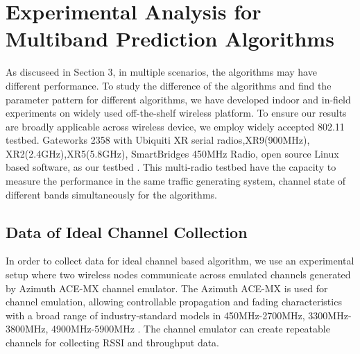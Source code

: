 \section{Experimental Analysis for Multiband Prediction Algorithms}
\label{sec:experiment design}


As discuseed in Section 3, in multiple scenarios, the algorithms may have different performance. To study the difference of the algorithms and find the parameter pattern for different algorithms, we have developed indoor and in-field experiments 
on widely used off-the-shelf wireless platform.
To ensure our results are broadly applicable across wireless device, we employ widely accepted 802.11 testbed. Gateworks 2358 with Ubiquiti XR serial radios,XR9(900MHz), XR2(2.4GHz),XR5(5.8GHz), SmartBridges 450MHz Radio, open source Linux based software, as our testbed \cite{Gateworks,Ubnt,Openwrt}. 
This multi-radio testbed have the capacity to measure the performance in the same traffic generating system, channel state of different bands simultaneously for the algorithms.


\subsection{Data of Ideal Channel Collection}
\label{subsec:ideal channel}
In order to collect data for ideal channel based algorithm, we use an experimental setup where two wireless nodes communicate across emulated channels generated by Azimuth ACE-MX channel emulator. 
The Azimuth ACE-MX is used for channel emulation, allowing controllable propagation and fading characteristics with a broad range of industry-standard models in 450MHz-2700MHz, 3300MHz-3800MHz, 4900MHz-5900MHz \cite{AzimuthACE}. 
The channel emulator can create repeatable channels for collecting RSSI and throughput data.

